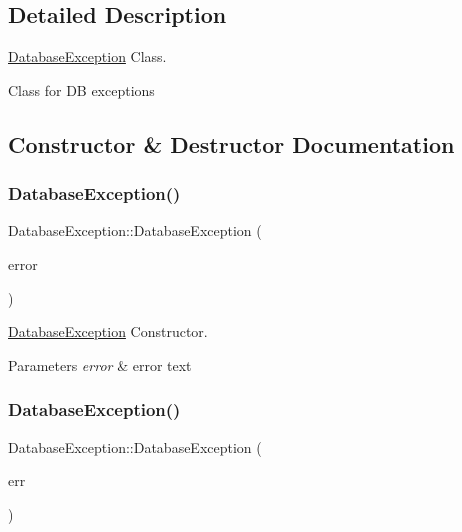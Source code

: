 \subsection{Detailed Description}
\hyperlink{class_database_exception}{Database\+Exception} Class. 

Class for DB exceptions 

\subsection{Constructor \& Destructor Documentation}
\mbox{\label{class_database_exception_a2a1031ccc2c355474552df6cfe368583}} 
\subsubsection{\texorpdfstring{Database\+Exception()}{DatabaseException()}\hspace{0.1cm}{\footnotesize\ttfamily [1/2]}}
{\footnotesize\ttfamily Database\+Exception\+::\+Database\+Exception (\begin{DoxyParamCaption}\item[{const char $\ast$}]{error }\end{DoxyParamCaption})}



\hyperlink{class_database_exception}{Database\+Exception} Constructor. 


\begin{DoxyParams}{Parameters}
{\em error} & error text \\
\hline
\end{DoxyParams}
\mbox{\label{class_database_exception_a4c11217be7b22d7a2f56fd81fc82d4cd}} 
\subsubsection{\texorpdfstring{Database\+Exception()}{DatabaseException()}\hspace{0.1cm}{\footnotesize\ttfamily [2/2]}}
{\footnotesize\ttfamily Database\+Exception\+::\+Database\+Exception (\begin{DoxyParamCaption}\item[{Error\+Type}]{err }\end{DoxyParamCaption})}



